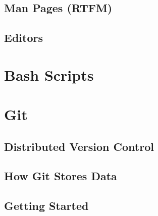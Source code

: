 \documentclass[10pt]{article}
\begin{document}
  \subsection{Man Pages (RTFM)}
  \subsection{Editors}
  
\section{Bash Scripts}


\section{Git}

  \subsection{Distributed Version Control}
  \subsection{How Git Stores Data}
  \subsection{Getting Started}
\end{document}
